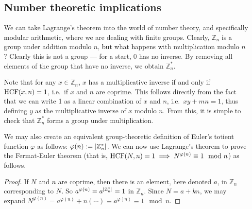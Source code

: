 \subsection{Number theoretic implications}
We can take Lagrange's theorem into the world of number theory, and specifically modular arithmetic, where we are dealing with finite groups.
Clearly, \(\mathbb Z_n\) is a group under addition modulo \(n\), but what happens with multiplication modulo \(n\)?
Clearly this is not a group --- for a start, 0 has no inverse.
By removing all elements of the group that have no inverse, we obtain \(\mathbb Z_n^*\).

Note that for any \(x \in \mathbb Z_n\), \(x\) has a multiplicative inverse if and only if \(\operatorname{HCF}(x, n) = 1\), i.e.\ if \(x\) and \(n\) are coprime.
This follows directly from the fact that we can write 1 as a linear combination of \(x\) and \(n\), i.e.\ \(xy + mn = 1\), thus defining \(y\) as the multiplicative inverse of \(x\) modulo \(n\).
From this, it is simple to check that \(\mathbb Z_n^*\) forms a group under multiplication.

We may also create an equivalent group-theoretic definition of Euler's totient function \(\varphi\) as follows: \(\varphi(n) := \abs{\mathbb Z_n^*}\).
We can now use Lagrange's theorem to prove the Fermat-Euler theorem (that is, \(\operatorname{HCF}(N, n) = 1 \implies N^{\varphi(n)} \equiv 1 \mod n\)) as follows.
\begin{proof}
	If \(N\) and \(n\) are coprime, then there is an element, here denoted \(a\), in \(\mathbb Z_n\) corresponding to \(N\).
	So \(a^{\varphi(n)} = a^{\abs{\mathbb Z_n^*}} = 1\) in \(\mathbb Z_n\).
	Since \(N = a + kn\), we may expand \(N^{\varphi(n)} = a^{\varphi(n)} + n(\cdots) \equiv a^{\varphi(n)} \equiv 1 \mod n\).
\end{proof}

